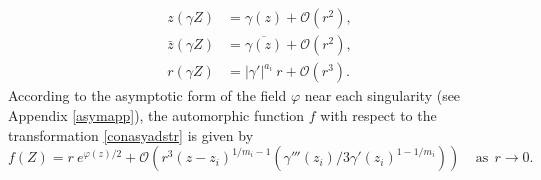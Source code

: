 \documentclass[a4paper,11pt]{article}
\def\gammma{		
		\text{\Large \textramshorns}
}
\newcommand\smallO{
	\mathchoice
	{{\scriptstyle\mathcal{O}}}%
	{{\scriptstyle\mathcal{O}}}%
	{{\scriptscriptstyle\mathcal{O}}}%
	{\scalebox{.7}{$\scriptscriptstyle\mathcal{O}$}}%
}
\begin{document}
\begin{equation}
\begin{aligned}
z(\gamma Z) &= \gamma(z)+\mathcal{O}(r^2),\\\bar{z}(\gamma Z) &= \overline{\gamma(z)}+\mathcal{O}(r^2),\\
r(\gamma Z) &= |\gamma'|^{a_i}~r+ \mathcal{O}(r^3).
\end{aligned}\label{conasyadstr}
\end{equation}
According to the asymptotic form of the field $\varphi$ near each singularity (see Appendix \ref{asymapp}), the automorphic function $f$ with respect to the transformation \eqref{conasyadstr} is given by
\begin{equation}
f(Z)= r~e^{\varphi(z)/2} +\mathcal{O}\left(r^3 \left(z-z_i\right)^{1/m_i -1}(\gamma'''(z_i)/3\gamma'(z_i)^{1-1/m_i})
\right)~~~~~ \text{as} ~~r\rightarrow 0.\label{fconical}
\end{equation}
\end{document}
